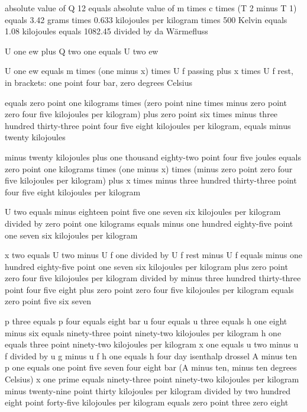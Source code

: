 absolute value of Q 12 equals absolute value of m times c times (T 2 minus T 1) equals 3.42 grams times 0.633 kilojoules per kilogram times 500 Kelvin equals 1.08 kilojoules equals 1082.45 divided by da Wärmefluss

U one ew plus Q two one equals U two ew

U one ew equals m times (one minus x) times U f passing plus x times U f rest, in brackets: one point four bar, zero degrees Celsius

equals zero point one kilograms times (zero point nine times minus zero point zero four five kilojoules per kilogram) plus zero point six times minus three hundred thirty-three point four five eight kilojoules per kilogram, equals minus twenty kilojoules

minus twenty kilojoules plus one thousand eighty-two point four five joules equals zero point one kilograms times (one minus x) times (minus zero point zero four five kilojoules per kilogram) plus x times minus three hundred thirty-three point four five eight kilojoules per kilogram

U two equals minus eighteen point five one seven six kilojoules per kilogram divided by zero point one kilograms equals minus one hundred eighty-five point one seven six kilojoules per kilogram

x two equals U two minus U f one divided by U f rest minus U f equals minus one hundred eighty-five point one seven six kilojoules per kilogram plus zero point zero four five kilojoules per kilogram divided by minus three hundred thirty-three point four five eight plus zero point zero four five kilojoules per kilogram equals zero point five six seven

p three equals p four equals eight bar  
u four equals u three equals h one eight minus six equals ninety-three point ninety-two kilojoules per kilogram  
h one equals three point ninety-two kilojoules per kilogram  
x one equals u two minus u f divided by u g minus u f  
h one equals h four  
day isenthalp drossel  
A minus ten  
p one equals one point five seven four eight bar (A minus ten, minus ten degrees Celsius)  
x one prime equals ninety-three point ninety-two kilojoules per kilogram minus twenty-nine point thirty kilojoules per kilogram divided by two hundred eight point forty-five kilojoules per kilogram equals zero point three zero eight